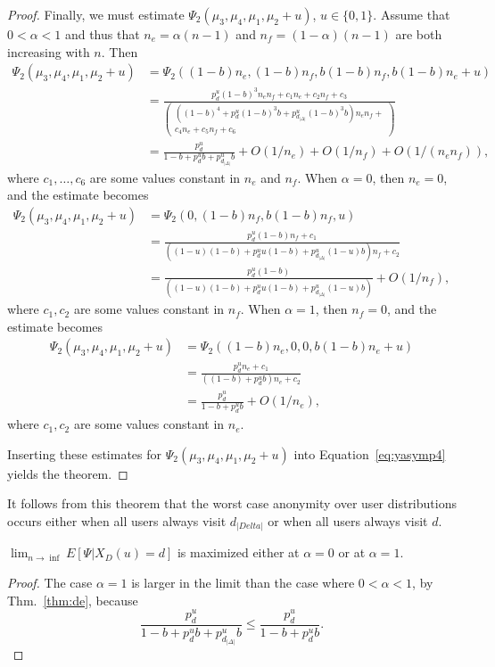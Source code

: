 \documentclass[prodmode,acmtissec]{acmsmall}
\begin{document}
\begin{proof}
Finally, we must estimate $\Psi_2(\mu_3,\mu_4,\mu_1,\mu_2+u)$, $u\in \{0,1\}$.  Assume that $0<\alpha<1$ and thus that $n_e = \alpha (n-1)$ and $n_f = (1-\alpha)(n-1)$ are both increasing with $n$.  Then
\begin{align*}
\Psi_2(\mu_3,\mu_4,\mu_1,\mu_2+u) &= \Psi_2((1-b)n_e,(1-b)n_f,b(1-b)n_f,b(1-b)n_e+u)\\
&= \frac{p^u_d (1-b)^3 n_e n_f + c_1 n_e + c_2 n_f + c_3 }{\left( \begin{array}{l} ((1-b)^4 + p^u_d (1-b)^3 b + p^u_{d_{|\Delta|}}(1-b)^3 b) n_e n_f +\\ c_4 n_e + c_5 n_f + c_6 \end{array} \right)}\\
&= \frac{p^u_d }{1-b + p^u_d b + p^u_{d_{|\Delta|}}b} + O(1/n_e) + O(1/n_f) + O(1/(n_e n_f)),
\end{align*}
where $c_1,\ldots ,c_6$ are some values constant in $n_e$ and $n_f$.
When $\alpha=0$, then $n_e=0$, and the estimate becomes
\begin{align*}
\Psi_2(\mu_3,\mu_4,\mu_1,\mu_2+u) &= \Psi_2(0,(1-b)n_f,b(1-b)n_f,u)\\
&= \frac{p^u_d (1-b) n_f + c_1}{ ((1-u)(1-b) + p^u_d u (1-b) + p^u_{d_{|\Delta|}} (1-u)b ) n_f + c_2}\\
&= \frac{p^u_d (1-b)}{ ((1-u)(1-b) + p^u_d u (1-b) + p^u_{d_{|\Delta|}} (1-u)b ) } + O(1/n_f),
\end{align*}
where $c_1,c_2$ are some values constant in $n_f$.
When $\alpha=1$, then $n_f=0$, and the estimate becomes
\begin{align*}
\Psi_2(\mu_3,\mu_4,\mu_1,\mu_2+u) &= \Psi_2((1-b)n_e,0,0,b(1-b)n_e+u)\\
&= \frac{p^u_d n_e + c_1}{((1-b) + p^u_d b)n_e +c_2} \\
&= \frac{p^u_d}{1-b + p^u_d b} + O(1/n_e),
\end{align*}
where $c_1,c_2$ are some values constant in $n_e$.

Inserting these estimates for $\Psi_2(\mu_3,\mu_4,\mu_1,\mu_2+u)$ into Equation~\ref{eq:yasymp4} yields the theorem.
\end{proof}

It follows from this theorem that the worst case anonymity over user distributions occurs either when all users always visit $d_{|Delta|}$ or when all users always visit $d$.
\begin{corollary} \label{cor:worst}
$\lim_{n\rightarrow \inf} E[\Psi | X_D(u)=d]$ is maximized either at $\alpha=0$ or at $\alpha=1$.
\end{corollary}
\begin{proof}
The case $\alpha=1$ is larger in the limit than the case where $0<\alpha < 1$, by Thm.~\ref{thm:de}, because
\begin{equation*}
 \frac{p^u_d }{1-b + p^u_d b + p^u_{d_{|\Delta|}}b} \le \frac{p^u_d}{1-b + p^u_d b}.
\end{equation*}
\end{proof}
\end{document}
